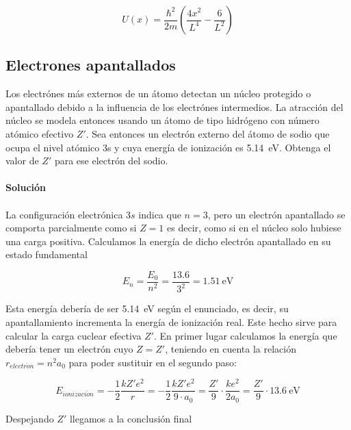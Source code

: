 \documentclass[12pt, a4paper]{article}
\begin{document}
    $$U(x)=\frac{\hbar^2}{2m} \left(\frac{4x^2}{L^4}-\frac{6}{L^2}\right)$$






    \subsection{Electrones apantallados}
    Los electrónes más externos de un átomo detectan un núcleo protegido o apantallado
    debido a la influencia de los electrónes intermedios. La atracción del núcleo se modela
    entonces usando un átomo de tipo hidrógeno con número atómico efectivo $Z'$. Sea entonces
    un electrón externo del átomo de sodio que ocupa el nivel atómico 3s y cuya energía
    de ionización es \SI{5.14}{\electronvolt}. Obtenga el valor de $Z'$ para ese electrón del sodio.

    \paragraph{\textbf{Solución}}

    \paragraph{} La configuración electrónica $3s$ indica que $n=3$, pero un electrón apantallado se comporta
    parcialmente como si $Z=1$ es decir, como si en el núcleo solo hubiese una carga positiva. Calculamos
    la energía de dicho electrón apantallado en su estado fundamental

    $$E_n = \frac{E_0}{n^2} = \frac{\num{13.6}}{3^2} = \SI{1.51}{\electronvolt}$$

    Esta energía debería de ser \SI{5.14}{\electronvolt} según el enunciado, es decir,
    su apantallamiento incrementa la energía de ionización real. Este hecho sirve
    para calcular la carga cuclear efectiva $Z'$. En primer lugar calculamos la
    energía que debería tener un electrón cuyo $Z = Z'$, teniendo en cuenta la relación
    $r_{electr\acute{o}n} = n^2 a_0$ para poder sustituir en el segundo paso:

    $$E_{ionizaci\acute{o}n}=-\frac{1}{2}\frac{kZ'e^2}{r} = -\frac{1}{2}\frac{k Z' e^2}{9 \cdot a_0} = \frac{Z'}{9}\cdot \frac{k e^2}{2 a_0}=
    \frac{Z'}{9}\cdot \SI{13.6}{\electronvolt}$$



    Despejando $Z'$ llegamos a la conclusión final
\end{document}
